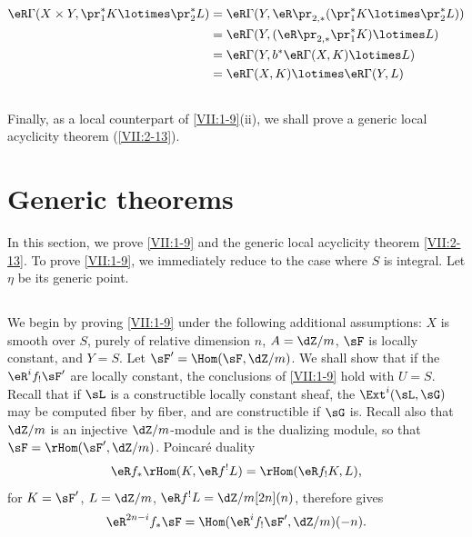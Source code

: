 \documentclass[oneside]{book}
\begin{document}
\begin{align*}
  \eR\Gamma(X\times Y,\pr_1^\ast K\lotimes \pr_2^\ast L)
    &= \eR\Gamma(Y,\eR \pr_{2,\ast}(\pr_1^\ast K\lotimes \pr_2^\ast L)) \\
    &= \eR\Gamma(Y,(\eR\pr_{2,\ast}\pr_1^\ast K)\lotimes L) \\
    &= \eR\Gamma(Y,b^\ast \eR\Gamma(X,K)\lotimes L) \\
    &= \eR\Gamma(X,K)\lotimes \eR\Gamma(Y,L)
\end{align*}






\subsection{}\label{VII:1-12}

Finally, as a local counterpart of \ref{VII:1-9}(ii), we shall prove a
generic local acyclicity theorem (\ref{VII:2-13}).











\section{Generic theorems}\label{VII:2}

In this section, we prove \ref{VII:1-9} and the generic local acyclicity theorem
\ref{VII:2-13}. To prove \ref{VII:1-9}, we immediately reduce to the case where
$S$ is integral. Let $\eta$ be its generic point.





\subsection{}\label{VII:2-1}

We begin by proving \ref{VII:1-9} under the following additional assumptions:
$X$ is smooth over $S$, purely of relative dimension $n$, $A=\dZ/m$, $\sF$ is
locally constant, and $Y=S$. Let $\sF'=\Hom(\sF,\dZ/m)$. We shall show that if
the $\eR^i f_! \sF'$ are locally constant, the conclusions of \ref{VII:1-9}
hold with $U=S$. Recall that if $\sL$ is a constructible locally constant
sheaf, the $\Ext^i(\sL,\sG)$ may be computed fiber by fiber, and are
constructible if $\sG$ is. Recall also that $\dZ/m$ is an injective
$\dZ/m$-module and is the dualizing module, so that
$\sF=\rHom(\sF',\dZ/m)$. Poincaré duality
\[
  \eR f_\ast \rHom(K,\eR f^! L) = \rHom(\eR f_! K,L) \text{,} 
\]
for $K=\sF'$, $L=\dZ/m$, $\eR f^! L = \dZ/m[2n](n)$, therefore gives
\[
  \eR^{2n-i} f_\ast \sF = \Hom(\eR^i f_! \sF',\dZ/m)(-n) \text{.} 
\]
\end{document}
